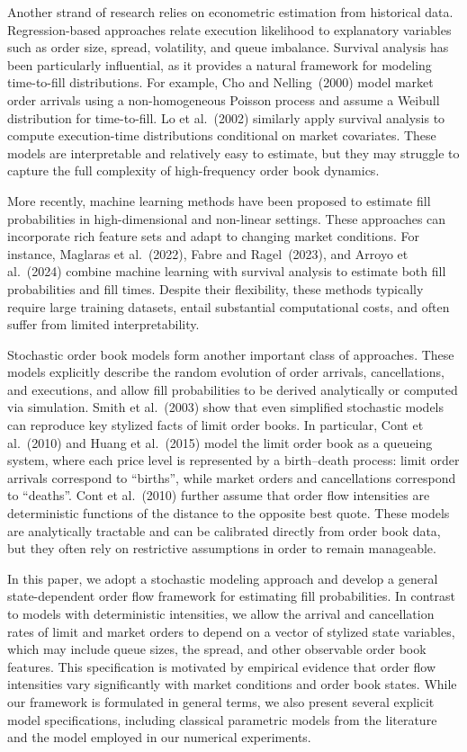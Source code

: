 \documentclass[11pt]{article}
\begin{document}
Another strand of research relies on econometric estimation from historical data. Regression-based approaches relate execution likelihood to explanatory variables such as order size, spread, volatility, and queue imbalance. Survival analysis has been particularly influential, as it provides a natural framework for modeling time-to-fill distributions. For example, Cho and Nelling~(2000) model market order arrivals using a non-homogeneous Poisson process and assume a Weibull distribution for time-to-fill. Lo et al.~(2002) similarly apply survival analysis to compute execution-time distributions conditional on market covariates. These models are interpretable and relatively easy to estimate, but they may struggle to capture the full complexity of high-frequency order book dynamics.

More recently, machine learning methods have been proposed to estimate fill probabilities in high-dimensional and non-linear settings. These approaches can incorporate rich feature sets and adapt to changing market conditions. For instance, Maglaras et al.~(2022), Fabre and Ragel~(2023), and Arroyo et al.~(2024) combine machine learning with survival analysis to estimate both fill probabilities and fill times. Despite their flexibility, these methods typically require large training datasets, entail substantial computational costs, and often suffer from limited interpretability.

Stochastic order book models form another important class of approaches. These models explicitly describe the random evolution of order arrivals, cancellations, and executions, and allow fill probabilities to be derived analytically or computed via simulation. Smith et al.~(2003) show that even simplified stochastic models can reproduce key stylized facts of limit order books. In particular, Cont et al.~(2010) and Huang et al.~(2015) model the limit order book as a queueing system, where each price level is represented by a birth--death process: limit order arrivals correspond to ``births'', while market orders and cancellations correspond to ``deaths''. Cont et al.~(2010) further assume that order flow intensities are deterministic functions of the distance to the opposite best quote. These models are analytically tractable and can be calibrated directly from order book data, but they often rely on restrictive assumptions in order to remain manageable.

In this paper, we adopt a stochastic modeling approach and develop a general state-dependent order flow framework for estimating fill probabilities. In contrast to models with deterministic intensities, we allow the arrival and cancellation rates of limit and market orders to depend on a vector of stylized state variables, which may include queue sizes, the spread, and other observable order book features. This specification is motivated by empirical evidence that order flow intensities vary significantly with market conditions and order book states. While our framework is formulated in general terms, we also present several explicit model specifications, including classical parametric models from the literature and the model employed in our numerical experiments.
\end{document}
